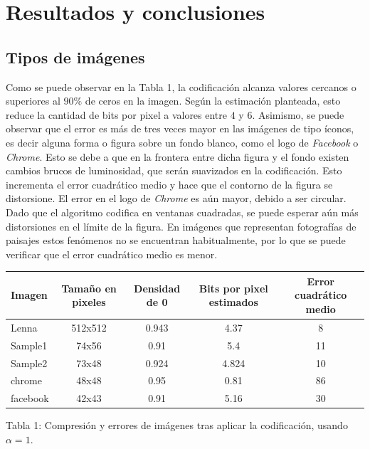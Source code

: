 \documentclass[%
	final,
	reprint,
	notitlepage,
	narroweqnarray,
	inline,
	twoside,
	invited
	]{ieee}
\begin{document}
\section{Resultados y conclusiones}

\subsection{Tipos de imágenes}

\par Como se puede observar en la Tabla 1, la codificación alcanza valores cercanos o superiores al $90\%$ de 
ceros en la imagen. Según la estimación planteada, esto reduce la cantidad de bits por pixel 
 a valores entre $4$ y $6$. Asimismo, se puede observar que el error es más de tres veces mayor en las imágenes de tipo 
íconos, es decir alguna forma o figura sobre un fondo blanco, como el logo de \textit{Facebook} o \textit{Chrome}.
 Esto se debe a que en la frontera entre dicha figura y el fondo existen cambios brucos de luminosidad, 
 que serán suavizados en la codificación. Esto incrementa el error cuadrático medio y hace que 
 el contorno de la figura se distorsione. El error en el logo de \textit{Chrome} es aún mayor, debido a ser  
 circular. Dado que el algoritmo codifica en ventanas cuadradas, se puede esperar aún más distorsiones 
 en el límite de la figura. En imágenes que representan fotografías de paisajes estos fenómenos no se 
 encuentran habitualmente, por lo que se puede verificar que el error cuadrático medio es menor.

\begin{center}
	\begin{tabular}{|l || c | c | c | c|}
		\hline
		\textbf{Imagen} & \textbf{Tamaño en pixeles} & \textbf{Densidad de 0} & \textbf{Bits por pixel estimados} & \textbf{Error cuadrático medio}\\
		\hline
		\hline
		Lenna & 512x512 & 0.943 & 4.37 & 8\\
		Sample1 & 74x56 & 0.91 & 5.4 & 11\\
		Sample2 & 73x48 & 0.924 & 4.824 & 10\\
		chrome & 48x48 & 0.95 & 0.81 & 86\\
		facebook & 42x43 & 0.91 & 5.16 & 30\\
		\hline
	\end{tabular}
\end{center}
\begin{center}
Tabla 1: Compresión y errores de imágenes tras aplicar la codificación, usando $\alpha=1$.
\end{center}
\end{document}
